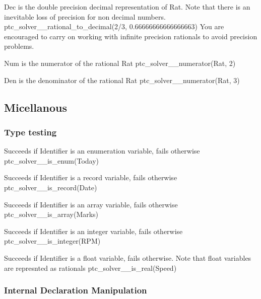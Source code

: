 \documentclass{article}
\begin{document}
        {Dec is the double precision decimal representation of Rat. Note that
there is an inevitable loss of precision for non decimal numbers.}
        {ptc\_solver\_\_rational\_to\_decimal(2/3, 0.66666666666666663)}
        {You are encouraged to carry on working with infinite precision rationals
to avoid precision problems.}

        {Num is the numerator of the rational Rat}
        {ptc\_solver\_\_numerator(Rat, 2)}
        {}

        {Den is the denominator of the rational Rat}
        {ptc\_solver\_\_numerator(Rat, 3)}
        {}
\subsection{Micellanous}

\subsubsection{Type testing}

\hspace{\parindent}
    {Succeeds if Identifier is an enumeration variable, fails otherwise}
    {ptc\_solver\_\_is\_enum(Today)}
    {}

    {Succeeds if Identifier is a record variable, fails otherwise}
    {ptc\_solver\_\_is\_record(Date)}
    {}

    {Succeeds if Identifier is an array variable, fails otherwise}
    {ptc\_solver\_\_is\_array(Marks)}
    {}

    {Succeeds if Identifier is an integer variable, fails otherwise}
    {ptc\_solver\_\_is\_integer(RPM)}
    {}

    {Succeeds if Identifier is a float variable, fails otherwise. Note that
float variables are represnted as rationals}
    {ptc\_solver\_\_is\_real(Speed)}
    {}

\subsubsection{Internal Declaration Manipulation}
\end{document}

